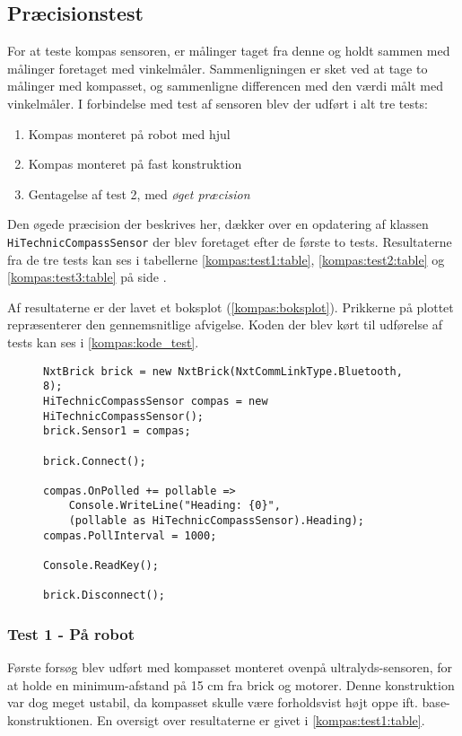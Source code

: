 \subsection{Præcisionstest}\label{kompas:precision}
For at teste kompas sensoren, er målinger taget fra denne og holdt sammen med målinger foretaget med vinkelmåler.
Sammenligningen er sket ved at tage to målinger med kompasset, og sammenligne differencen med den værdi målt med vinkelmåler.
I forbindelse med test af sensoren blev der udført i alt tre tests:
\begin{enumerate}
\item Kompas monteret på robot med hjul
\item Kompas monteret på fast konstruktion
\item Gentagelse af test 2, med \textit{øget præcision}
\end{enumerate}
Den øgede præcision der beskrives her, dækker over en opdatering af \mindsqualls klassen \lstinline[style=csharp]!HiTechnicCompassSensor! der blev foretaget efter de første to tests.
Resultaterne fra de tre tests kan ses i tabellerne \ref{kompas:test1:table}, \ref{kompas:test2:table} og \ref{kompas:test3:table} på side \pageref{kompas:test1:table}.

Af resultaterne er der lavet et boksplot (\cref{kompas:boksplot}).
Prikkerne på plottet repræsenterer den gennemsnitlige afvigelse.
Koden der blev kørt til udførelse af tests kan ses i \cref{kompas:kode_test}.

\begin{figure}[h]
\begin{lstlisting}[style=csharpsmall,caption={Kode brugt til test},label=kompas:kode_test,frame=single]
NxtBrick brick = new NxtBrick(NxtCommLinkType.Bluetooth, 8);
HiTechnicCompassSensor compas = new HiTechnicCompassSensor();
brick.Sensor1 = compas;

brick.Connect();

compas.OnPolled += pollable =>
	Console.WriteLine("Heading: {0}",
	(pollable as HiTechnicCompassSensor).Heading);
compas.PollInterval = 1000;

Console.ReadKey();

brick.Disconnect();
\end{lstlisting}
\end{figure}

\subsubsection{Test 1 - På robot}
Første forsøg blev udført med kompasset monteret ovenpå ultralyds-sensoren, for at holde en minimum-afstand på 15 cm fra brick og motorer.
Denne konstruktion var dog meget ustabil, da kompasset skulle være forholdsvist højt oppe ift. base-konstruktionen.
En oversigt over resultaterne er givet i \cref{kompas:test1:table}.

